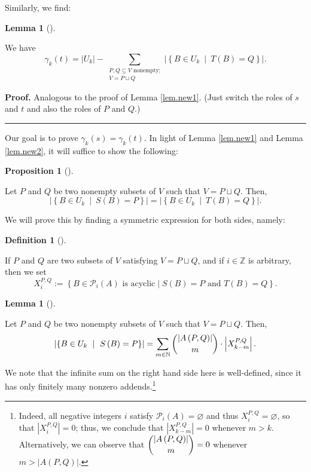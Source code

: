 \documentclass[numbers=enddot,12pt,final,onecolumn,notitlepage]{scrartcl}%
\theoremstyle{definition}
\newtheorem{lem}[theo]{Lemma}
\newenvironment{lemma}[1][]
{\begin{lem}[#1]\begin{leftbar}}
{\end{leftbar}\end{lem}}
\newtheorem{prop}[theo]{Proposition}
\newenvironment{proposition}[1][]
{\begin{prop}[#1]\begin{leftbar}}
{\end{leftbar}\end{prop}}
\newtheorem{defi}[theo]{Definition}
\newenvironment{definition}[1][]
{\begin{defi}[#1]\begin{leftbar}}
{\end{leftbar}\end{defi}}
\newenvironment{proof}[1][Proof]{\noindent\textbf{#1.} }{\ \rule{0.5em}{0.5em}}
\let\sumnonlimits\sum
\renewcommand{\sum}{\sumnonlimits\limits}
\theoremstyle{plainsl}
\begin{document}
Similarly, we find:

\begin{lemma}
\label{lem.new2}We have%
\[
\gamma_{k}\left(  t\right)  =\left\vert U_{k}\right\vert -\sum
_{\substack{P,Q\subseteq V\text{ nonempty;}\\V=P\sqcup Q}}\left\vert \left\{
B\in U_{k}\ \mid\ T\left(  B\right)  =Q\right\}  \right\vert .
\]

\end{lemma}

\begin{proof}
Analogous to the proof of Lemma \ref{lem.new1}. (Just switch the roles of $s$
and $t$ and also the roles of $P$ and $Q$.)
\end{proof}

Our goal is to prove $\gamma_{k}\left(  s\right)  =\gamma_{k}\left(  t\right)
$. In light of Lemma \ref{lem.new1} and Lemma \ref{lem.new2}, it will suffice
to show the following:

\begin{proposition}
\label{prop.new3}Let $P$ and $Q$ be two nonempty subsets of $V$ such that
$V=P\sqcup Q$. Then,%
\[
\left\vert \left\{  B\in U_{k}\ \mid\ S\left(  B\right)  =P\right\}
\right\vert =\left\vert \left\{  B\in U_{k}\ \mid\ T\left(  B\right)
=Q\right\}  \right\vert .
\]

\end{proposition}

We will prove this by finding a symmetric expression for both sides, namely:

\begin{definition}
If $P$ and $Q$ are two subsets of $V$ satisfying $V=P\sqcup Q$, and if
$i\in\mathbb{Z}$ is arbitrary, then we set%
\[
X_{i}^{P,Q}:=\left\{  B\in\mathcal{P}_{i}(A)\text{ is acyclic}\mid
S(B)=P\text{ and }T(B)=Q\right\}  .
\]

\end{definition}

\begin{lemma}
\label{lem.new4}Let $P$ and $Q$ be two nonempty subsets of $V$ such that
$V=P\sqcup Q$. Then,%
\[
\left\vert \left\{  B\in U_{k}\ \mid\ S\left(  B\right)  =P\right\}
\right\vert =\sum_{m\in\mathbb{N}}\dbinom{\left\vert A\left(  P,Q\right)
\right\vert }{m}\cdot\left\vert X_{k-m}^{P,Q}\right\vert .
\]

\end{lemma}

We note that the infinite sum on the right hand side here is well-defined,
since it has only finitely many nonzero addends.\footnote{Indeed, all negative
integers $i$ satisfy $\mathcal{P}_{i}\left(  A\right)  =\varnothing$ and thus
$X_{i}^{P,Q}=\varnothing$, so that $\left\vert X_{i}^{P,Q}\right\vert =0$;
thus, we conclude that $\left\vert X_{k-m}^{P,Q}\right\vert =0$ whenever
$m>k$. Alternatively, we can observe that $\dbinom{\left\vert A\left(
P,Q\right)  \right\vert }{m}=0$ whenever $m>\left\vert A\left(  P,Q\right)
\right\vert $.}
\end{document}
